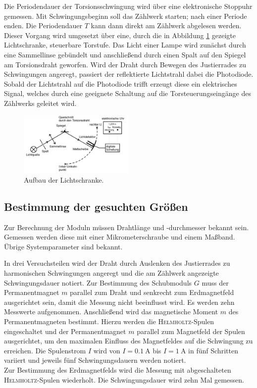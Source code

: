 \label{sec:durchfuehrung2}
Die Periodendauer der Torsionsschwingung wird über eine elektronische Stoppuhr gemessen. 
Mit Schwingungsbeginn soll das Zählwerk starten; nach einer Periode enden. Die Periodendauer $T$ kann dann direkt am Zählwerk abgelesen werden. Dieser Vorgang wird umgesetzt über eine, durch die in Abbildung \ref{fig:aufbau2} gezeigte Lichtschranke, steuerbare Torstufe. 
Das Licht einer Lampe wird zunächst durch eine Sammellinse gebündelt und anschließend durch einen Spalt auf den Spiegel am Torsionsdraht geworfen. Wird der Draht durch Bewegen des Justierrades zu Schwingungen angeregt, passiert der reflektierte Lichtstrahl dabei die Photodiode.  
Sobald der Lichtstrahl auf die Photodiode trifft erzeugt diese ein elektrisches Signal, welches durch eine geeignete Schaltung auf die Torsteuerungseingänge des Zählwerks geleitet wird.
\begin{figure}
	\centering
	\includegraphics[width=0.5\textwidth]{Bilder/Aufbau2.pdf}
	\caption{Aufbau der Lichtschranke. \cite{V102}}
	\label{fig:aufbau2}
\end{figure}
\newpage
\subsection{Bestimmung der gesuchten Größen}
Zur Berechnung der Moduln müssen Drahtlänge und -durchmesser bekannt sein. 
Gemessen werden diese mit einer Mikrometerschraube und einem Maßband.
Übrige Systemparameter sind bekannt.

In drei Versuchsteilen wird der Draht durch Auslenken des Justierrades zu harmonischen Schwingungen angeregt und die am Zählwerk angezeigte Schwingungsdauer notiert.
Zur Bestimmung des Schubmoduls $G$ muss der Permanentmagnet $m$ parallel zum Draht und senkrecht zum Erdmagnetfeld ausgerichtet sein, damit die Messung nicht beeinflusst wird.
Es werden zehn Messwerte aufgenommen.
Anschließend wird das magnetische Moment $m$ des Permanentmagneten bestimmt. 
Hierzu werden die \textsc{Helmholtz}-Spulen eingeschaltet und der Permanentmagnet $m$ parallel zum Magnetfeld der Spulen ausgerichtet, um den maximalen Einfluss des Magnetfeldes auf die Schwingung zu erreichen.  
Die Spulenstrom $I$ wird von $I=\SI{0.1}{\ampere}$ bis $I=\SI{1}{\ampere}$ in fünf Schritten variiert und jeweils fünf Schwingungsdauern werden notiert.\\
Zur Bestimmung des Erdmagnetfelds wird die Messung mit abgeschalteten \\ \textsc{Helmholtz}-Spulen wiederholt.
Die Schwingungsdauer wird zehn Mal gemessen.
